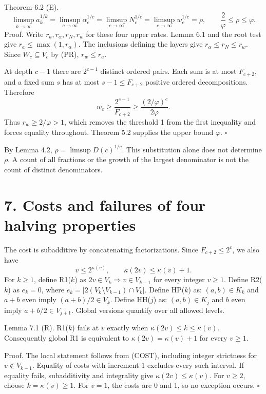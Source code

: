 \documentclass[11pt]{article}
\begin{document}
Theorem 6.2 (E).
\[
\limsup_{k\to\infty}a_k^{1/k}
=\limsup_{c\to\infty}\alpha_c^{1/c}
=\limsup_{c\to\infty}N_c^{1/c}
=\limsup_{c\to\infty}w_c^{1/c}
=\rho,\qquad \frac2\varphi\le\rho\le\varphi.
\]
Proof. Write \(r_a,r_\alpha,r_N,r_w\) for these four upper rates. Lemma 6.1 and the root test give \(r_a\le\max(1,r_\alpha)\). The inclusions defining the layers give \(r_\alpha\le r_N\le r_w\). Since \(W_c\subseteq V_c\) by (PR), \(r_w\le r_a\).

At depth \(c-1\) there are \(2^{c-1}\) distinct ordered pairs. Each sum is at most \(F_{c+2}\), and a fixed sum \(s\) has at most \(s-1\le F_{c+2}\) positive ordered decompositions. Therefore
\[
w_c\ge\frac{2^{c-1}}{F_{c+2}}\ge\frac{(2/\varphi)^c}{2\varphi}.
\]
Thus \(r_w\ge2/\varphi>1\), which removes the threshold 1 from the first inequality and forces equality throughout. Theorem 5.2 supplies the upper bound \(\varphi\). \(\square\)

By Lemma 4.2, \(\rho=\limsup D(c)^{1/c}\). This substitution alone does not determine \(\rho\). A count of all fractions or the growth of the largest denominator is not the count of distinct denominators.

\section*{7. Costs and failures of four halving properties}

The cost is subadditive by concatenating factorizations. Since \(F_{c+2}\le2^c\), we also have
\[
v\le2^{\kappa(v)},\qquad \kappa(2v)\le\kappa(v)+1.
\]
For \(k\ge1\), define R1(\(k\)) as \(2v\in V_k\Rightarrow v\in V_{k-1}\) for every integer \(v\ge1\). Define R2(\(k\)) as \(e_k=0\), where \(e_k=|2(V_k\setminus V_{k-1})\cap V_k|\). Define HP(\(k\)) as: \((a,b)\in K_k\) and \(a+b\) even imply \((a+b)/2\in V_k\). Define HH(\(j\)) as: \((a,b)\in K_j\) and \(b\) even imply \(a+b/2\in V_{j+1}\). Global versions quantify over all allowed levels.

Lemma 7.1 (R). R1(\(k\)) fails at \(v\) exactly when \(\kappa(2v)\le k\le\kappa(v)\). Consequently global R1 is equivalent to \(\kappa(2v)=\kappa(v)+1\) for every \(v\ge1\).

Proof. The local statement follows from (COST), including integer strictness for \(v\notin V_{k-1}\). Equality of costs with increment 1 excludes every such interval. If equality fails, subadditivity and integrality give \(\kappa(2v)\le\kappa(v)\). For \(v\ge2\), choose \(k=\kappa(v)\ge1\). For \(v=1\), the costs are 0 and 1, so no exception occurs. \(\square\)
\end{document}
